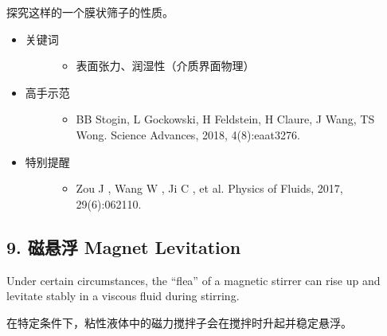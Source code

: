 \documentclass[a4paper,10pt,english]{sphinxmanual}
\begin{document}
探究这样的一个膜状筛子的性质。
\begin{itemize}
\item {} \begin{description}
\item[{关键词}] \leavevmode\begin{itemize}
\item {} 
表面张力、润湿性（介质界面物理）

\end{itemize}

\end{description}

\item {} \begin{description}
\item[{高手示范}] \leavevmode\begin{itemize}
\item {} 
BB Stogin, L Gockowski, H Feldstein, H Claure, J Wang, TS Wong.  Science Advances, 2018, 4(8):eaat3276.

\end{itemize}

\end{description}

\item {} \begin{description}
\item[{特别提醒}] \leavevmode\begin{itemize}
\item {} 
Zou J , Wang W , Ji C , et al.  Physics of Fluids, 2017, 29(6):062110.

\end{itemize}

\end{description}

\end{itemize}


\subsection{9. 磁悬浮 Magnet Levitation}
\label{\detokenize{8. Appendix:magnet-levitation}}
Under certain circumstances, the “flea” of a magnetic stirrer can rise up and levitate stably in a viscous fluid during stirring.

在特定条件下，粘性液体中的磁力搅拌子会在搅拌时升起并稳定悬浮。
\end{document}
